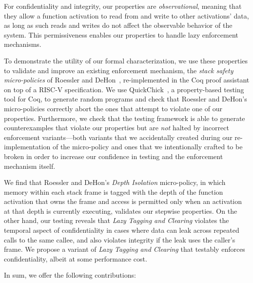 \documentclass[10pt,conference]{ieeetran}%
\theoremstyle{definition}
\begin{document}
For confidentiality and integrity, our properties are {\em observational},
meaning that they allow a function activation to read from and write to other activations'
data, as long as such reads and writes do not affect the observable behavior of the
system. This permissiveness enables our properties to handle lazy enforcement mechanisms.

To demonstrate the utility of our formal characterization, we use these
properties to validate and improve an existing enforcement mechanism, the
{\em stack safety micro-policies} of Roessler and DeHon~\cite{DBLP:conf/sp/RoesslerD18}, re-implemented
in the Coq proof assistant on top of a RISC-V specification.  We
use QuickChick~\cite{Denes:VSL2014,Pierce:SF4}, a property-based testing
tool for Coq, to generate random programs and check
that Roessler and DeHon's micro-policies correctly abort the ones that
attempt to violate one of our properties. Furthermore, we
%
check that the testing framework is able to generate counterexamples
that violate our properties but are \emph{not} halted by incorrect
enforcement variants---both variants that we accidentally created
during our re-implementation of the micro-policy and ones that we
intentionally crafted to be broken in order to increase our confidence
in testing and the enforcement mechanism itself.

We find that Roessler and DeHon's {\em Depth Isolation} micro-policy, in
which memory within each stack frame is tagged with the depth of
the function activation that owns the frame and access is
permitted only when an activation at that depth is currently executing, validates our
stepwise properties. On the other hand, our testing reveals that \emph{Lazy Tagging and Clearing}
violates the temporal aspect of confidentiality in
cases where data can leak across repeated calls to the same callee,
and also violates integrity if the leak uses the caller's frame. We
propose a variant of {\em Lazy Tagging and Clearing} that testably enforces
confidentiality, albeit at some performance cost.
%


In sum, we offer the following contributions:
\end{document}
